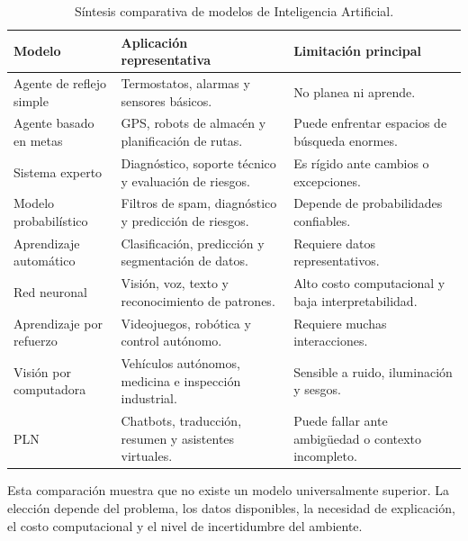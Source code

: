 \begin{table}[h!]
\centering
\small
\renewcommand{\arraystretch}{1.25}
\begin{tabularx}{\textwidth}{L{3.1cm} Y Y}
\toprule
\textbf{Modelo} & \textbf{Aplicación representativa} & \textbf{Limitación principal} \\
\midrule
Agente de reflejo simple & Termostatos, alarmas y sensores básicos. & No planea ni aprende. \\
Agente basado en metas & GPS, robots de almacén y planificación de rutas. & Puede enfrentar espacios de búsqueda enormes. \\
Sistema experto & Diagnóstico, soporte técnico y evaluación de riesgos. & Es rígido ante cambios o excepciones. \\
Modelo probabilístico & Filtros de spam, diagnóstico y predicción de riesgos. & Depende de probabilidades confiables. \\
Aprendizaje automático & Clasificación, predicción y segmentación de datos. & Requiere datos representativos. \\
Red neuronal & Visión, voz, texto y reconocimiento de patrones. & Alto costo computacional y baja interpretabilidad. \\
Aprendizaje por refuerzo & Videojuegos, robótica y control autónomo. & Requiere muchas interacciones. \\
Visión por computadora & Vehículos autónomos, medicina e inspección industrial. & Sensible a ruido, iluminación y sesgos. \\
PLN & Chatbots, traducción, resumen y asistentes virtuales. & Puede fallar ante ambigüedad o contexto incompleto. \\
\bottomrule
\end{tabularx}
\caption{Síntesis comparativa de modelos de Inteligencia Artificial.}
\label{tab:comparacion}
\end{table}

Esta comparación muestra que no existe un modelo universalmente superior. La elección depende del problema, los datos disponibles, la necesidad de explicación, el costo computacional y el nivel de incertidumbre del ambiente.
